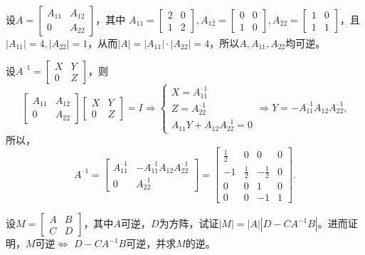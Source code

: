 \begin{solution}
设$A = \begin{bmatrix} A_{11} & A_{12} \\ 0 & A_{22} \end{bmatrix}$，其中
$A_{11} = \begin{bmatrix} 2 & 0 \\ 1 & 2 \end{bmatrix}, A_{12} = \begin{bmatrix} 0 & 0 \\ 1 & 0 \end{bmatrix}, A_{22} = \begin{bmatrix} 1 & 0 \\ 1 & 1 \end{bmatrix}$，且$|A_{11}| = 4, |A_{22}| = 1$，从而$|A| = |A_{11}|\cdot|A_{22}| = 4$，所以$A, A_{11}, A_{22}$均可逆。

设$A^{–1} = \begin{bmatrix} X & Y \\ 0 & Z \end{bmatrix}$，则
$$\begin{bmatrix} A_{11} & A_{12} \\ 0 & A_{22} \end{bmatrix}\begin{bmatrix} X & Y \\ 0 & Z \end{bmatrix} = I \Longrightarrow
\begin{cases} X = A_{11}^{–1} \\ Z = A_{22}^{–1} \\ A_{11}Y + A_{12}A_{22}^{–1} = 0 \end{cases} \Longrightarrow
Y = -A_{11}^{–1}A_{12}A_{22}^{–1},$$
所以，
$$A^{–1} = \begin{bmatrix} A_{11}^{–1} & -A_{11}^{–1}A_{12}A_{22}^{–1} \\ 0 & A_{22}^{–1} \end{bmatrix} = \begin{bmatrix} \frac12 & 0 & 0 & 0 \\ -1 & \frac12 & -\frac12 & 0 \\ 0 & 0 & 1 & 0 \\ 0 & 0 & -1 & 1 \end{bmatrix}.$$
\end{solution}

\begin{eg}
设$M = \begin{bmatrix} A & B \\ C & D \end{bmatrix}$，其中$A$可逆，$D$为方阵，试证$|M| = |A||D-CA^{-1}B|$。进而证明，$M$可逆$\Longleftrightarrow$ $D-CA^{-1}B$可逆，并求$M$的逆。
\end{eg}

